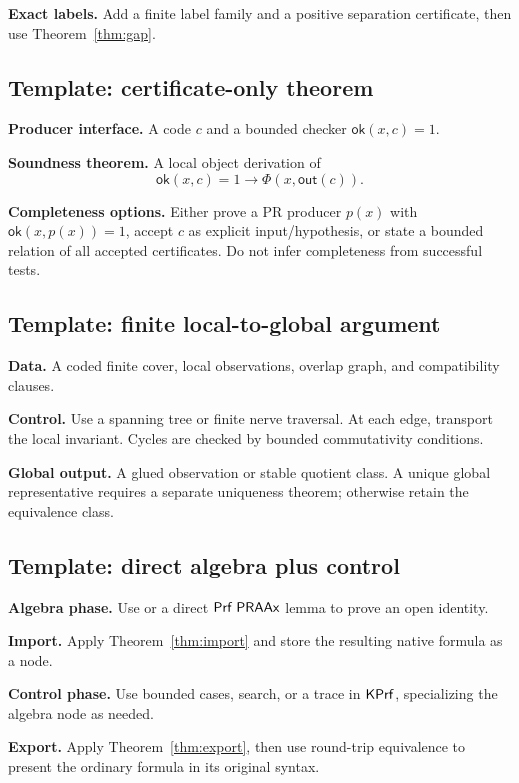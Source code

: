\textbf{Exact labels.}
Add a finite label family and a positive separation certificate, then use
Theorem~\ref{thm:gap}.

\subsection{Template: certificate-only theorem}

\textbf{Producer interface.}
A code \(c\) and a bounded checker \(\mathsf{ok}(x,c)=1\).

\textbf{Soundness theorem.}
A local object derivation of
\[
       \mathsf{ok}(x,c)=1\to\Phi(x,\mathsf{out}(c)).
\]

\textbf{Completeness options.}
Either prove a PR producer \(p(x)\) with \(\mathsf{ok}(x,p(x))=1\), accept
\(c\) as explicit input/hypothesis, or state a bounded relation of all accepted
certificates.  Do not infer completeness from successful tests.

\subsection{Template: finite local-to-global argument}

\textbf{Data.}
A coded finite cover, local observations, overlap graph, and compatibility
clauses.

\textbf{Control.}
Use a spanning tree or finite nerve traversal.  At each edge, transport the
local invariant.  Cycles are checked by bounded commutativity conditions.

\textbf{Global output.}
A glued observation or stable quotient class.  A unique global representative
requires a separate uniqueness theorem; otherwise retain the equivalence class.

\subsection{Template: direct algebra plus control}

\textbf{Algebra phase.}
Use  or a direct \(\mathsf{Prf}\;\mathsf{PRAAx}\) lemma to prove an open
identity.

\textbf{Import.}
Apply Theorem~\ref{thm:import} and store the resulting native formula as a node.

\textbf{Control phase.}
Use bounded cases, search, or a trace in \(\mathsf{KPrf}\), specializing the algebra
node as needed.

\textbf{Export.}
Apply Theorem~\ref{thm:export}, then use round-trip equivalence to present the
ordinary formula in its original syntax.
